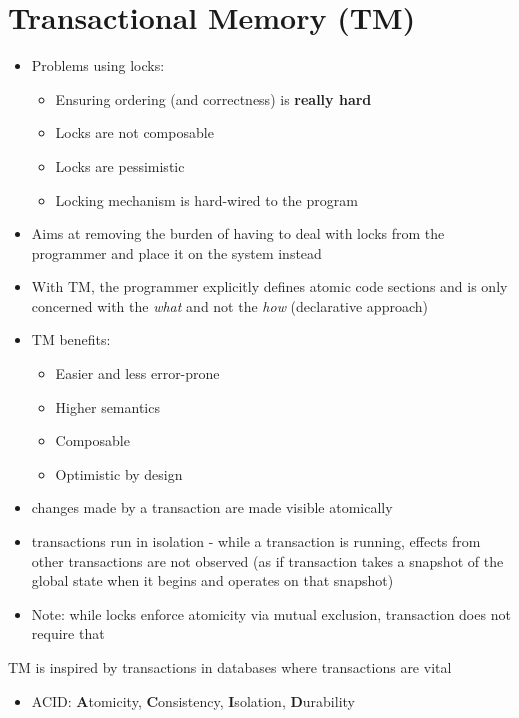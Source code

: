 \documentclass[a4paper]{article}
\begin{document}
\section{Transactional Memory (TM)}
\begin{itemize}
\item Problems using locks:
\begin{itemize}
\item Ensuring ordering (and correctness) is \textbf{really hard}
\item Locks are not composable
\item Locks are pessimistic
\item Locking mechanism is hard-wired to the program
\end{itemize}

\item Aims at removing the burden of having to deal with locks from the programmer and place it on the system instead
\item With TM, the programmer explicitly defines atomic code sections and is only concerned with the \textsl{what} and not the \textsl{how} (declarative approach)
\item TM benefits: 
\begin{itemize}
\item Easier and less error-prone
\item Higher semantics
\item Composable
\item Optimistic by design
\end{itemize}

\item changes made by a transaction are made visible atomically
\item  transactions run in isolation - while a transaction is running, effects from other transactions are not observed (as if transaction takes a snapshot of the global state when it begins and operates on that snapshot)
\item Note: while locks enforce atomicity via mutual exclusion, transaction does not require that
\end{itemize}
\item TM is inspired by transactions in databases where transactions are vital 
\begin{itemize}
\item ACID: \textbf{A}tomicity, \textbf{C}onsistency, \textbf{I}solation, \textbf{D}urability
\end{itemize}
\end{document}
